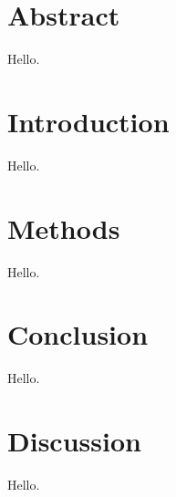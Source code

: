 \documentclass{article}
\begin{document}
\section{Abstract}
Hello.

\section{Introduction}
Hello.

\section{Methods}
Hello.

\section{Conclusion}
Hello.

\section{Discussion}
Hello.
\end{document}
